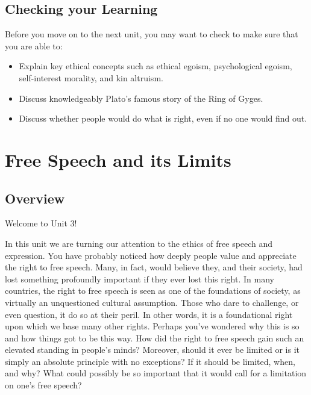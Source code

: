 \documentclass[
]{book}
\providecommand{\tightlist}{%
  \setlength{\itemsep}{0pt}\setlength{\parskip}{0pt}}
\begin{document}
\hypertarget{checking-your-learning-1}{%
\section*{Checking your Learning}\label{checking-your-learning-1}}

\begin{progress}
Before you move on to the next unit, you may want to check to make sure that you are able to:

\begin{itemize}
\tightlist
\item
  Explain key ethical concepts such as ethical egoism, psychological egoism, self-interest morality, and kin altruism.
\item
  Discuss knowledgeably Plato's famous story of the Ring of Gyges.
\item
  Discuss whether people would do what is right, even if no one would find out.
\end{itemize}
\end{progress}

\hypertarget{free-speech-and-its-limits}{%
\chapter{Free Speech and its Limits}\label{free-speech-and-its-limits}}

\hypertarget{overview-2}{%
\section*{Overview}\label{overview-2}}

Welcome to Unit 3!

In this unit we are turning our attention to the ethics of free speech and expression. You have probably noticed how deeply people value and appreciate the right to free speech. Many, in fact, would believe they, and their society, had lost something profoundly important if they ever lost this right. In many countries, the right to free speech is seen as one of the foundations of society, as virtually an unquestioned cultural assumption. Those who dare to challenge, or even question, it do so at their peril. In other words, it is a foundational right upon which we base many other rights. Perhaps you've wondered why this is so and how things got to be this way. How did the right to free speech gain such an elevated standing in people's minds? Moreover, should it ever be limited or is it simply an absolute principle with no exceptions? If it should be limited, when, and why? What could possibly be so important that it would call for a limitation on one's free speech?
\end{document}
